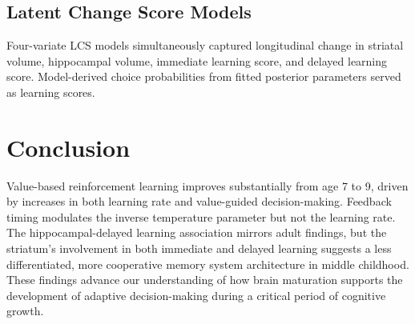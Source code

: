 \documentclass[11pt]{article}
\begin{document}
\subsection{Latent Change Score Models}

Four-variate LCS models \citep{mcardle2009} simultaneously captured longitudinal change in striatal volume, hippocampal volume, immediate learning score, and delayed learning score. Model-derived choice probabilities from fitted posterior parameters served as learning scores.

\section{Conclusion}

Value-based reinforcement learning improves substantially from age 7 to 9, driven by increases in both learning rate and value-guided decision-making. Feedback timing modulates the inverse temperature parameter but not the learning rate. The hippocampal-delayed learning association mirrors adult findings, but the striatum's involvement in both immediate and delayed learning suggests a less differentiated, more cooperative memory system architecture in middle childhood. These findings advance our understanding of how brain maturation supports the development of adaptive decision-making during a critical period of cognitive growth.


\end{document}

